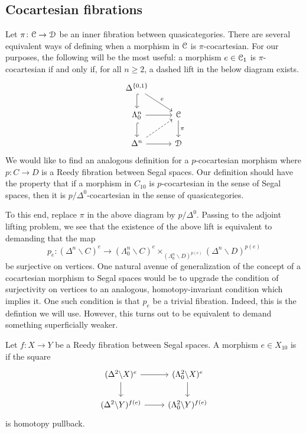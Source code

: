 \documentclass[main.tex]{subfiles}
\begin{document}
\subsection{Cocartesian fibrations}
\label{ssc:cocartesian_fibrations}

Let $\pi\colon \mathcal{C} \to \mathcal{D}$ be an inner fibration between quasicategories. There are several equivalent ways of defining when a morphism in $\mathcal{C}$ is $\pi$-cocartesian. For our purposes, the following will be the most useful: a morphism $e \in \mathcal{C}_{1}$ is $\pi$-cocartesian if and only if, for all $n \geq 2$, a dashed lift in the below diagram exists. 
\begin{equation*}
  \begin{tikzcd}
    \Delta^{\{0, 1\}}
    \arrow[d, hook]
    \arrow[dr, "e"]
    \\
    \Lambda^{n}_{0}
    \arrow[r]
    \arrow[d, hook]
    & \category{C}
    \arrow[d, "\pi"]
    \\
    \Delta^{n}
    \arrow[r]
    \arrow[ur, dashed]
    & \category{D}
  \end{tikzcd}
\end{equation*}
We would like to find an analogous definition for a $p$-cocartesian morphism where $p\colon C \to D$ is a Reedy fibration between Segal spaces. Our definition should have the property that if a morphism in $C_{10}$ is $p$-cocartesian in the sense of Segal spaces, then it is $p / \Delta^{0}$-cocartesian in the sense of quasicategories.

To this end, replace $\pi$ in the above diagram by $p / \Delta^{0}$. Passing to the adjoint lifting problem, we see that the existence of the above lift is equivalent to demanding that the map
\begin{equation}
  p_{e}\colon (\Delta^{n} \backslash C)^{e} \to (\Lambda^{n}_{0} \backslash C)^{e} \times_{(\Lambda^{n}_{0} \backslash D)^{p(e)}} (\Delta^{n} \backslash D)^{p(e)}
\end{equation}
be surjective on vertices. One natural avenue of generalization of the concept of a cocartesian morphism to Segal spaces would be to upgrade the condition of surjectivity on vertices to an analogous, homotopy-invariant condition which implies it. One such condition is that $p_{e}$ be a trivial fibration. Indeed, this is the defintion we will use. However, this turns out to be equivalent to demand something superficially weaker.

\begin{definition}
  \label{def:cocartesian_morphism}
  Let $f\colon X \to Y$ be a Reedy fibration between Segal spaces. A morphism $e \in X_{10}$ is  if the square
  \begin{equation*}
    \begin{tikzcd}
      (\Delta^{2} \backslash X)^{e}
      \arrow[r]
      \arrow[d]
      & (\Lambda^{2}_{0} \backslash X)^{e}
      \arrow[d]
      \\
      (\Delta^{2} \backslash Y)^{f(e)}
      \arrow[r]
      & (\Lambda^{2}_{0} \backslash Y)^{f(e)}
    \end{tikzcd}
  \end{equation*}
  is homotopy pullback.
\end{definition}
\end{document}
